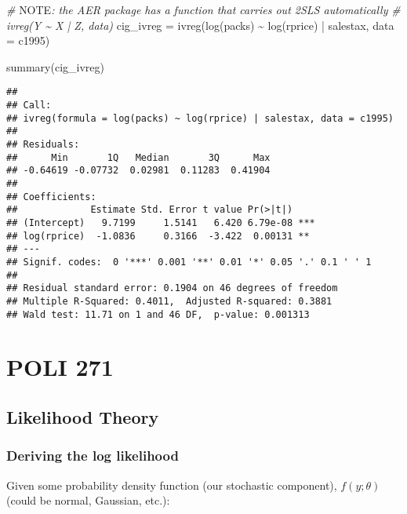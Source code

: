 \documentclass[
]{article}
\newenvironment{Shaded}{\begin{snugshade}}{\end{snugshade}}
\newcommand{\AlertTok}[1]{\textcolor[rgb]{0.94,0.16,0.16}{#1}}
\newcommand{\AttributeTok}[1]{\textcolor[rgb]{0.77,0.63,0.00}{#1}}
\newcommand{\CommentTok}[1]{\textcolor[rgb]{0.56,0.35,0.01}{\textit{#1}}}
\newcommand{\FunctionTok}[1]{\textcolor[rgb]{0.00,0.00,0.00}{#1}}
\newcommand{\NormalTok}[1]{#1}
\newcommand{\OtherTok}[1]{\textcolor[rgb]{0.56,0.35,0.01}{#1}}
\newcommand{\SpecialCharTok}[1]{\textcolor[rgb]{0.00,0.00,0.00}{#1}}
\begin{document}
\begin{Shaded}
\begin{Highlighting}[]
\CommentTok{\# }\AlertTok{NOTE}\CommentTok{: the AER package has a function that carries out 2SLS automatically}
\CommentTok{\# ivreg(Y \textasciitilde{} X | Z, data)}
\NormalTok{cig\_ivreg }\OtherTok{=} \FunctionTok{ivreg}\NormalTok{(}\FunctionTok{log}\NormalTok{(packs) }\SpecialCharTok{\textasciitilde{}} \FunctionTok{log}\NormalTok{(rprice) }\SpecialCharTok{|}\NormalTok{ salestax, }\AttributeTok{data =}\NormalTok{ c1995)}

\FunctionTok{summary}\NormalTok{(cig\_ivreg)}
\end{Highlighting}
\end{Shaded}

\begin{verbatim}
## 
## Call:
## ivreg(formula = log(packs) ~ log(rprice) | salestax, data = c1995)
## 
## Residuals:
##      Min       1Q   Median       3Q      Max 
## -0.64619 -0.07732  0.02981  0.11283  0.41904 
## 
## Coefficients:
##             Estimate Std. Error t value Pr(>|t|)    
## (Intercept)   9.7199     1.5141   6.420 6.79e-08 ***
## log(rprice)  -1.0836     0.3166  -3.422  0.00131 ** 
## ---
## Signif. codes:  0 '***' 0.001 '**' 0.01 '*' 0.05 '.' 0.1 ' ' 1
## 
## Residual standard error: 0.1904 on 46 degrees of freedom
## Multiple R-Squared: 0.4011,  Adjusted R-squared: 0.3881 
## Wald test: 11.71 on 1 and 46 DF,  p-value: 0.001313
\end{verbatim}

\hypertarget{poli-271}{%
\section{POLI 271}\label{poli-271}}

\hypertarget{likelihood-theory}{%
\subsection{Likelihood Theory}\label{likelihood-theory}}

\hypertarget{deriving-the-log-likelihood}{%
\subsubsection{Deriving the log
likelihood}\label{deriving-the-log-likelihood}}

Given some probability density function (our stochastic component),
\(f(y;\theta)\) (could be normal, Gaussian, etc.):
\end{document}
